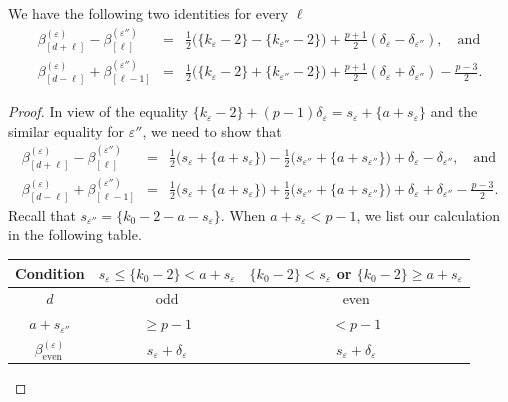 \begin{lemma}
    \label{L:case-by-case_check_AL}
    We have the following two identities for every $\ell$ \begin{eqnarray*} \beta_{[d+\ell]}^{(\varepsilon)}-\beta_{[\ell]}^{(\varepsilon'')} &=&\tfrac12\big(\{k_\varepsilon-2\}-\{k_{\varepsilon''}-2\}\big) + \tfrac{p+1}2( \delta_\varepsilon-\delta_{\varepsilon''} ), \quad\textrm{and} \\ \beta_{[d-\ell]}^{(\varepsilon)} + \beta_{[\ell-1]}^{(\varepsilon'')}&=& \tfrac12\big(\{k_\varepsilon - 2\} + \{k_{\varepsilon''}-2\} \big)  + \tfrac{p+1}2 (\delta_\varepsilon + \delta_{\varepsilon''}) - \tfrac{p-3}2. \end{eqnarray*}
\end{lemma}

\begin{proof}
    In view of the equality $\{k_\varepsilon -2 \} + (p-1)\delta_\varepsilon = s_\varepsilon +\{a+s_\varepsilon\}$ and the similar equality for $\varepsilon''$, we need to show that \begin{eqnarray} \label{E:beta_plus_beta_and_beta_-_beta} \beta_{[d+\ell]}^{(\varepsilon)}-\beta_{[\ell]}^{(\varepsilon'')} & =&\tfrac12\big(s_\varepsilon + \{a+s_\varepsilon\}\big) -\tfrac 12\big(s_{\varepsilon''} + \{a+s_{\varepsilon''}\}\big) +  \delta_\varepsilon-\delta_{\varepsilon''}, \quad\textrm{and} \\ \label{E:beta_plus_beta_and_beta_-_beta-continued} \beta_{[d-\ell]}^{(\varepsilon)} + \beta_{[\ell-1]}^{(\varepsilon'')} &=&\tfrac12\big(s_\varepsilon+ \{a+s_\varepsilon \} \big) + \tfrac12\big(s_{\varepsilon''} + \{a+s_{\varepsilon''}\}\big) + \delta_\varepsilon + \delta_{\varepsilon''} -\tfrac{p-3}2. \end{eqnarray}
    Recall that $s_{\varepsilon''} = \{k_0-2-a-s_\varepsilon \}$.
    When $a+s_\varepsilon < p-1$, we list our calculation  in the following table.
    \begin{center}
    \begin{tabular}{|c|c|c|}
    \hline
    Condition & $s_\varepsilon\leq  \{k_0-2\} < a+s_\varepsilon$ &$\{k_0-2\}< s_\varepsilon $ or $\{k_0-2\} \geq a+s_\varepsilon$ \\
    \hline
    $d$ &  odd & even \\
    \hline
    $a+ s_{\varepsilon''}$ &  $\geq p-1$ & $< p-1$ \\
    \hline
    $\beta^{(\varepsilon)}_{\mathrm{even}}$ & $s_\varepsilon + \delta_\varepsilon$& $s_\varepsilon + \delta_\varepsilon$ \\

\end{tabular}
\end{center}
\end{proof}
